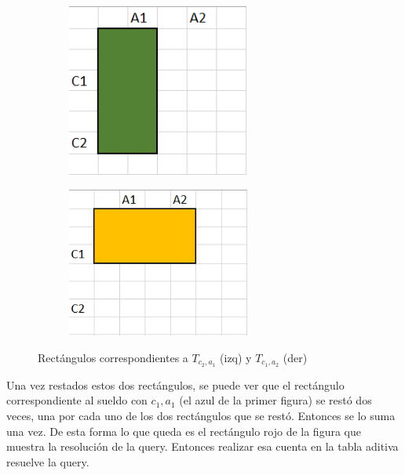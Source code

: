 \begin{figure}[H]
 
\begin{subfigure}{0.5\textwidth}
    \centering
\includegraphics[width=6cm]{Imagenes/Ej3d.png} 
\end{subfigure}
\begin{subfigure}{0.5\textwidth}
    \centering
\includegraphics[width=6cm]{Imagenes/Ej3e.png}
\end{subfigure}
 
\caption{Rectángulos correspondientes a $T_{c_2,a_1}$ (izq) y $T_{c_1,a_2}$ (der)}
\end{figure}



Una vez restados estos dos rectángulos, se puede ver que el rectángulo correspondiente al sueldo con $c_1,a_1$ (el azul de la primer figura) se restó dos veces, una por cada uno de los dos rectángulos que se restó. Entonces se lo suma una vez. De esta forma lo que queda es el rectángulo rojo de la figura que muestra la resolución de la query. Entonces realizar esa cuenta en la tabla aditiva resuelve la query.

